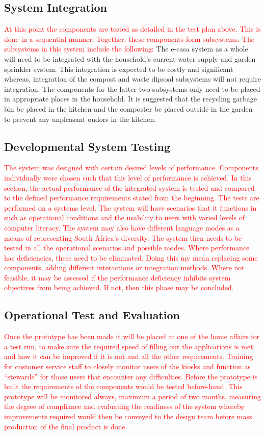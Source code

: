 \documentclass[a4paper,11pt,fleqn]{report}
\begin{document}
\subsection{System Integration}
\textcolor{red}{At this point the components are tested as detailed in the test plan above. This is done in a sequential manner. Together, these components form subsystems. The subsystems in this system include the following:}
The \ac{e-casa} system as a whole will need to be integrated with the household's current water supply and garden sprinkler system. This integration is expected to be costly and significant whereas, integration of the compost and waste dipsoal subsystems will not require integration. The components for the latter two subsystems only need to be placed in appropriate places in the household. It is suggested that the recycling garbage bin be placed in the kitchen and the composter be placed outside in the garden to prevent any unpleasant oudors in the kitchen.

\subsection{Developmental System Testing}
\textcolor{red}{The system was designed with certain desired levels of performance. Components individually were chosen such that this level of performance is achieved. In this section, the actual performance of the integrated system is tested and compared to the defined performance requirements stated from the beginning. The tests are performed on a systems level. The system will have scenarios that it functions in such as operational conditions and the usability to users with varied levels of computer literacy. The system may also have different language modes as a means of representing South Africa’s diversity. The system then needs to be tested in all the operational scenarios and possible modes. Where performance has deficiencies, these need to be eliminated. Doing this my mean replacing some components, adding different interactions or integration methods. Where not feasible, it may be assessed if the performance deficiency inhibits system objectives from being achieved. If not, then this phase may be concluded.}

\subsection{Operational Test and Evaluation}
\textcolor{red}{Once the prototype has been made it will be placed at one of the home affairs for a test run, to make sure the required speed of filling out the applications is met and how it can be improved if it is not and all the other requirements. Training for customer service staff to closely monitor users of the kiosks and function as “stewards” for those users that encounter any difficulties. Before the prototype is built the requirements of the components would be tested before-hand. This prototype will be monitored always, maximum a period of two months, measuring the degree of compliance and evaluating the readiness of the system whereby improvements required would then be conveyed to the design team before mass production of the final product is done.}
\end{document}
